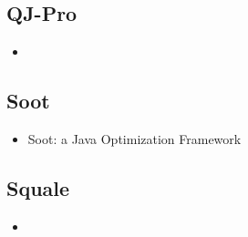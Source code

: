 \subsection{QJ-Pro}
\begin{itemize}
\item \cite{existingtools:qjpro}
\end{itemize}

\subsection{Soot}
\begin{itemize}
\item Soot: a Java Optimization Framework \cite{existingtools:soot}
\end{itemize}

\subsection{Squale}
\begin{itemize}
\item \cite{existingtools:squale}
\end{itemize}

